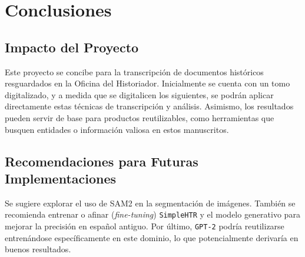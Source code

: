 \documentclass[11pt,a4paper]{article}
\begin{document}
\section{Conclusiones}
\subsection{Impacto del Proyecto}

Este proyecto se concibe para la transcripción de documentos históricos resguardados en la Oficina del Historiador. Inicialmente se cuenta con un tomo digitalizado, y a medida que se digitalicen los siguientes, se podrán aplicar directamente estas técnicas de transcripción y análisis. Asimismo, los resultados pueden servir de base para productos reutilizables, como herramientas que busquen entidades o información valiosa en estos manuscritos.

\subsection{Recomendaciones para Futuras Implementaciones}

Se sugiere explorar el uso de SAM2 en la segmentación de imágenes. También se recomienda entrenar o afinar (\textit{fine-tuning}) \texttt{SimpleHTR} y el modelo generativo para mejorar la precisión en español antiguo. Por último, \texttt{GPT-2} podría reutilizarse entrenándose específicamente en este dominio, lo que potencialmente derivaría en buenos resultados.

 

\end{document}
